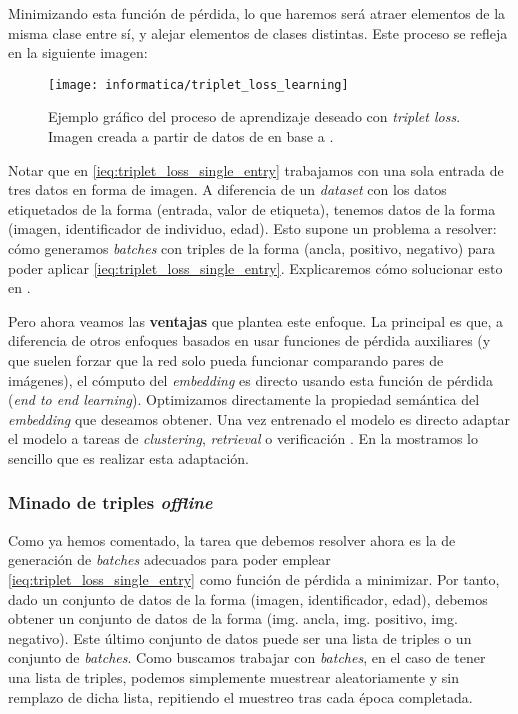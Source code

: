 Minimizando esta función de pérdida, lo que haremos será atraer elementos de la misma clase entre sí, y alejar elementos de clases distintas. Este proceso se refleja en la siguiente imagen:

\begin{figure}[H]
	\centering
	\texttt{[image: informatica/triplet\_loss\_learning]}
	\caption{Ejemplo gráfico del proceso de aprendizaje deseado con \textit{triplet loss}. Imagen creada a partir de datos de \cite{informatica:cacd_dataset} en base a \cite{informatica:facenet}.}
\end{figure}

Notar que en \eqref{ieq:triplet_loss_single_entry} trabajamos con una sola entrada de tres datos en forma de imagen. A diferencia de un \textit{dataset} con los datos etiquetados de la forma (entrada, valor de etiqueta), tenemos datos de la forma (imagen, identificador de individuo, edad). Esto supone un problema a resolver: cómo generamos \textit{batches} con triples de la forma (ancla, positivo, negativo) para poder aplicar \eqref{ieq:triplet_loss_single_entry}. Explicaremos cómo solucionar esto en .

Pero ahora veamos las \textbf{ventajas} que plantea este enfoque. La principal es que, a diferencia de otros enfoques basados en usar funciones de pérdida auxiliares (y que suelen forzar que la red solo pueda funcionar comparando pares de imágenes), el cómputo del \textit{embedding} es directo usando esta función de pérdida (\textit{end to end learning}). Optimizamos directamente la propiedad semántica del \textit{embedding} que deseamos obtener. Una vez entrenado el modelo es directo adaptar el modelo a tareas de \textit{clustering}, \textit{retrieval} o verificación \cite{informatica:principal}. En la  mostramos lo sencillo que es realizar esta adaptación.

\subsubsection{Minado de triples \textit{offline}} \label{isubs:enfoque_offline_minado_triples}

Como ya hemos comentado, la tarea que debemos resolver ahora es la de generación de \textit{batches} adecuados para poder emplear \eqref{ieq:triplet_loss_single_entry} como función de pérdida a minimizar. Por tanto, dado un conjunto de datos de la forma (imagen, identificador, edad), debemos obtener un conjunto de datos de la forma (img. ancla, img. positivo, img. negativo). Este último conjunto de datos puede ser una lista de triples o un conjunto de \textit{batches}. Como buscamos trabajar con \textit{batches}, en el caso de tener una lista de triples, podemos simplemente muestrear aleatoriamente y sin remplazo de dicha lista, repitiendo el muestreo tras cada época completada.

